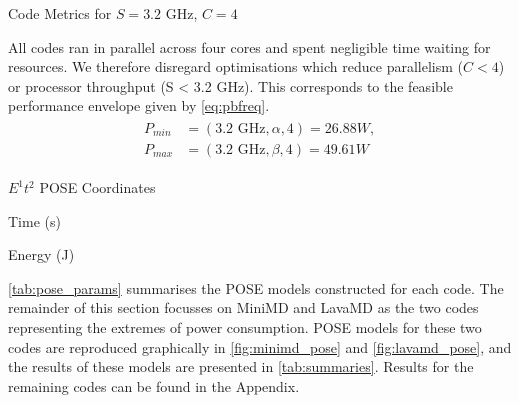 \begin{table}
  \scriptsize
  \centering
  \caption{Code Metrics for $S = 3.2\text{ GHz}$, $C = 4$}
  \label{tab:code_metrics}
  
\end{table}

All codes ran in parallel across four cores and spent negligible time waiting for resources.
We therefore disregard optimisations which reduce parallelism ($C < 4$) or processor throughput (S < 3.2 GHz).
This corresponds to the feasible performance envelope given by \autoref{eq:pbfreq}.
\begin{align}
  \label{eq:pbfreq}
  \begin{split}
    P_{min} &= (3.2\text{ GHz}, \alpha, 4) = 26.88W, \\
    P_{max} &= (3.2\text{ GHz}, \beta, 4) = 49.61W
  \end{split}
\end{align}

\begin{table}
  \setlength{\tabcolsep}{.5em}
  \scriptsize
  \caption{$E^1t^2$ POSE Coordinates}
  \begin{subtable}{\linewidth}
  \centering
  \caption{Time (s)}
  
  \end{subtable}
  \par\bigskip 
  \begin{subtable}{\linewidth}
  \centering
  \caption{Energy (J)}
  
  \end{subtable}
  \label{tab:pose_params}
\end{table}

\autoref{tab:pose_params} summarises the POSE models constructed for each code.
The remainder of this section focusses on MiniMD and LavaMD as the two codes representing the extremes of power consumption.
POSE models for these two codes are reproduced graphically in \autoref{fig:minimd_pose} and \autoref{fig:lavamd_pose}, and the results of these models are presented in \autoref{tab:summaries}.
Results for the remaining codes can be found in the Appendix.

